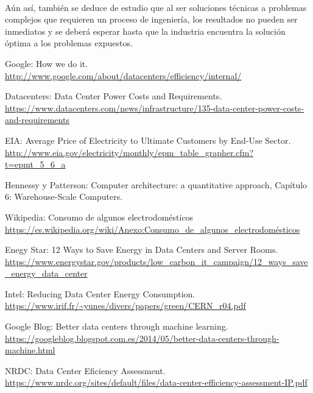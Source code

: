 \documentclass[12pt]{article}
\begin{document}
  	\paragraph{}
    Aún así, también se deduce de estudio que al ser soluciones técnicas a problemas complejos que requieren un proceso de ingeniería, los resultados no pueden ser inmediatos y se deberá esperar hasta que la industria encuentra la solución óptima a los problemas expuestos.
	\clearpage
  \begin{thebibliography}{9}
    	Google: How we do it. \url{http://www.google.com/about/datacenters/efficiency/internal/}
        
    	Datacenters: Data Center Power Costs and Requirements. \url{https://www.datacenters.com/news/infrastructure/135-data-center-power-costs-and-requirements}   
        
    	EIA:  Average Price of Electricity to Ultimate Customers by End-Use Sector. \url{http://www.eia.gov/electricity/monthly/epm_table_grapher.cfm?t=epmt_5_6_a}
        
    	Hennessy y Patterson: Computer architecture: a quantitative approach, Capítulo 6: Warehouse-Scale Computers.
        
    	Wikipedia: Consumo de algunos electrodomésticos \url{https://es.wikipedia.org/wiki/Anexo:Consumo_de_algunos_electrodomésticos}

		Enegy Star: 12 Ways to Save Energy in Data Centers and Server Rooms. \newline \url{https://www.energystar.gov/products/low_carbon_it_campaign/12_ways_save_energy_data_center}

    Intel: Reducing Data Center Energy Consumption. \newline
 		\url{https://www.irif.fr/~yunes/divers/papers/green/CERN_r04.pdf}

    Google Blog: Better data centers through machine learning. \newline
		\url{https://googleblog.blogspot.com.es/2014/05/better-data-centers-through-machine.html}

    NRDC: Data Center Eficiency Assessment. \newline
 		\url{https://www.nrdc.org/sites/default/files/data-center-efficiency-assessment-IP.pdf}


\end{thebibliography}
\end{document}
